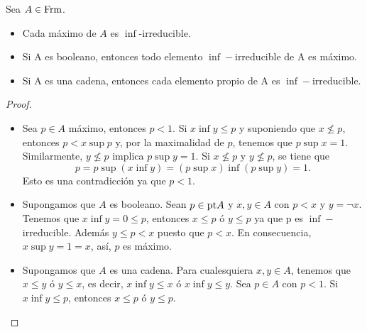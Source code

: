 \begin{lemma}
  Sea $A\in \mathrm{Frm}$.
  \begin{itemize}
      \item Cada máximo de $A$ es $\inf$-irreducible.
      \item Si A es booleano, entonces todo elemento $\inf-$irreducible de A es máximo.
      \item Si A es una cadena, entonces cada elemento propio de A es $\inf-$irreducible.
  \end{itemize}
\end{lemma}
\begin{proof}\quad
  \begin{itemize}
      \item Sea $p\in A$ máximo, entonces $p<1$. Si $x\inf y\leq p$ y suponiendo que $x\not\leq p$, entonces $p<x\sup p$ y, por la maximalidad de $p$, tenemos que $p\sup x=1$. Similarmente, $y\not\leq p$ implica $p\sup y=1$. Si $x\not\leq p$ y $y\not\leq p$, se tiene que 
      \[p=p\sup (x\inf y)=(p\sup x)\inf(p\sup y)=1.\]
      Esto es una contradicción ya que $p<1$.
      \item Supongamos que $A$ es booleano. Sean $p\in\mathrm{pt} A$ y $x,y\in A$ con $p<x$ y $y=\neg x$. Tenemos que $x\inf y=0\leq p$, entonces $x\leq p$ ó $y\leq p$ ya que p es $\inf-$irreducible. Además $y\leq p<x$ puesto que $p<x$. En consecuencia, $x\sup y=1=x$, así, $p$ es máximo.
      \item Supongamos que $A$ es una cadena. Para cualesquiera $x,y\in A$, tenemos que $x\leq y$ ó $y\leq x$, es decir, $x\inf y\leq x$ ó $x\inf y\leq y$. Sea $p\in A$ con $p<1$. Si $x\inf y\leq p$, entonces $x\leq p$ ó $y\leq p$.
  \end{itemize}
\end{proof}

